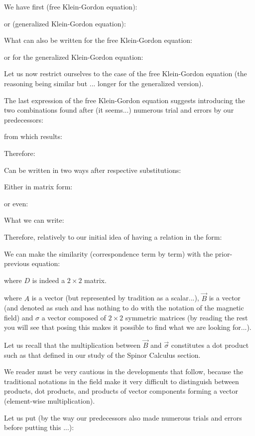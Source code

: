 	We have first (free Klein-Gordon equation):
	
	or (generalized Klein-Gordon equation):
	
	What can also be written for the free Klein-Gordon equation:
	
	or for the generalized Klein-Gordon equation:
	
	Let us now restrict ourselves to the case of the free Klein-Gordon equation (the reasoning being similar but ... longer for the generalized version).

	The last expression of the free Klein-Gordon equation suggests introducing the two combinations found after (it seems...) numerous trial and errors by our predecessors:
	
	from which results:
	
	Therefore:
	
	Can be written in two ways after respective substitutions:
	
	Either in matrix form:
	
	or even:
	
	What we can write:
	
	Therefore, relatively to our initial idea of having a relation in the form:
	
	We can make the similarity (correspondence term by term) with the prior-previous equation:
	
	where $D$ is indeed a $2\times 2$ matrix.
	
	where $A$ is a vector (but represented by tradition as a scalar...), $\vec{B}$ is a vector (and denoted as such and has nothing to do with the notation of the magnetic field) and $\sigma$ a vector composed of $2\times 2$ symmetric matrices (by reading the rest you will see that posing this makes it possible to find what we are looking for...).

	Let us recall that the multiplication between $\vec{B}$ and $\vec{\sigma}$ constitutes a dot product such as that defined in our study of the Spinor Calculus section.
	\begin{tcolorbox}[title=Remark,colframe=black,arc=10pt]
	We reader must be very cautious in the developments that follow, because the traditional notations in the field make it very difficult to distinguish between products, dot products, and products of vector components forming a vector (element-wise multiplication).
	\end{tcolorbox}
	Let us put (by the way our predecessors also made numerous trials and errors before putting this ...):
	
